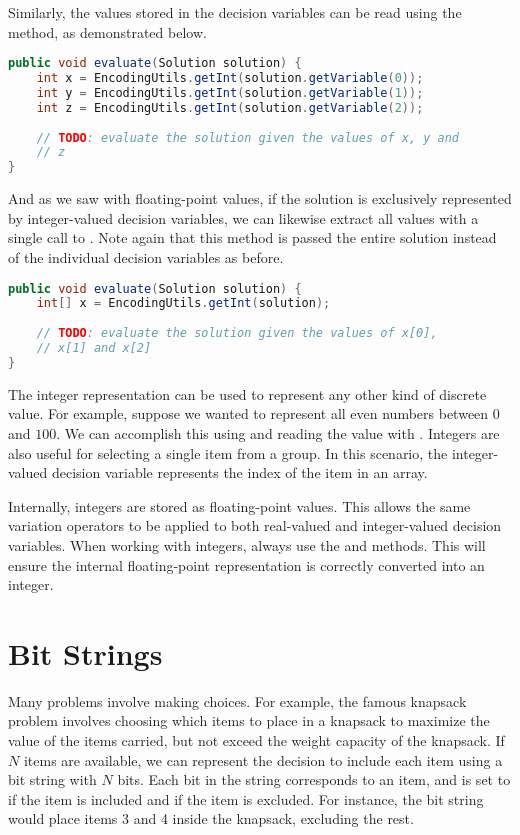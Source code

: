 Similarly, the values stored in the decision variables can be read using the  method, as demonstrated below.
\begin{lstlisting}[language=Java]
public void evaluate(Solution solution) {
    int x = EncodingUtils.getInt(solution.getVariable(0));
    int y = EncodingUtils.getInt(solution.getVariable(1));
    int z = EncodingUtils.getInt(solution.getVariable(2));
    
    // TODO: evaluate the solution given the values of x, y and
    // z
}
\end{lstlisting}

And as we saw with floating-point values, if the solution is exclusively represented by integer-valued decision variables, we can likewise extract all values with a single call to .  Note again that this method is passed the entire solution instead of the individual decision variables as before.
\begin{lstlisting}[language=Java]
public void evaluate(Solution solution) {
    int[] x = EncodingUtils.getInt(solution);
        
    // TODO: evaluate the solution given the values of x[0],
    // x[1] and x[2]
}
\end{lstlisting}

The integer representation can be used to represent any other kind of discrete value.  For example, suppose we wanted to represent all even numbers between $0$ and $100$.  We can accomplish this using  and reading the value with .  Integers are also useful for selecting a single item from a group.  In this scenario, the integer-valued decision variable represents the index of the item in an array.

\begin{tip}
Internally, integers are stored as floating-point values.  This allows the same variation operators to be applied to both real-valued and integer-valued decision variables.  When working with integers, always use the  and  methods.  This will ensure the internal floating-point representation is correctly converted into an integer.
\end{tip}

\section{Bit Strings}
Many problems involve making choices.  For example, the famous knapsack problem involves choosing which items to place in a knapsack to maximize the value of the items carried, but not exceed the weight capacity of the knapsack.  If $N$ items are available, we can represent the decision to include each item using a bit string with $N$ bits.  Each bit in the string corresponds to an item, and is set to  if the item is included and  if the item is excluded.  For instance, the bit string  would place items 3 and 4 inside the knapsack, excluding the rest.

